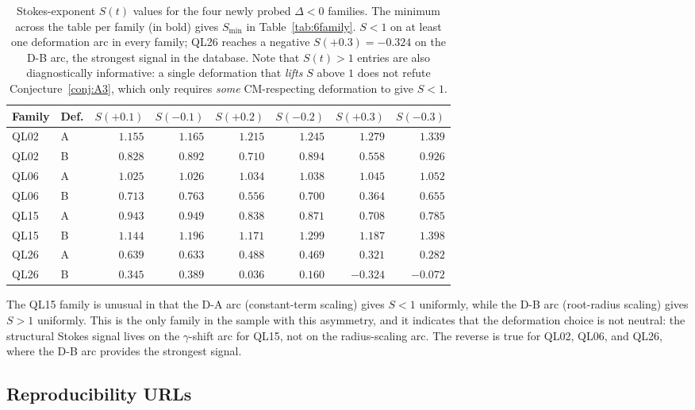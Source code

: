 \documentclass[11pt,reqno]{amsart}
\theoremstyle{definition}
\begin{document}
\begin{table}[h]
\centering
\small
\begin{tabular}{llrrrrrr}
\toprule
Family & Def. & $S(+0.1)$ & $S(-0.1)$ & $S(+0.2)$ & $S(-0.2)$ & $S(+0.3)$ & $S(-0.3)$ \\
\midrule
QL02 & A & $1.155$  & $1.165$  & $1.215$  & $1.245$  & $1.279$  & $1.339$ \\
QL02 & B & $0.828$  & $0.892$  & $0.710$  & $0.894$  & $\mathbf{0.558}$ & $0.926$ \\
QL06 & A & $1.025$  & $1.026$  & $1.034$  & $1.038$  & $1.045$  & $1.052$ \\
QL06 & B & $0.713$  & $0.763$  & $0.556$  & $0.700$  & $\mathbf{0.364}$ & $0.655$ \\
QL15 & A & $0.943$  & $0.949$  & $0.838$  & $0.871$  & $0.708$  & $0.785$ \\
QL15 & B & $1.144$  & $1.196$  & $1.171$  & $1.299$  & $1.187$  & $1.398$ \\
QL26 & A & $0.639$  & $0.633$  & $0.488$  & $0.469$  & $0.321$  & $0.282$ \\
QL26 & B & $0.345$  & $0.389$  & $0.036$  & $0.160$  & $\mathbf{-0.324}$ & $-0.072$ \\
\bottomrule
\end{tabular}
\caption{Stokes-exponent $S(t)$ values
for the four newly probed $\Delta<0$ families. The minimum
across the table per family (in bold) gives $S_{\min}$ in
Table~\ref{tab:6family}. $S<1$ on at least one deformation
arc in every family; QL26 reaches a negative
$S(+0.3)=-0.324$ on the D-B arc, the strongest signal in
the database. Note that $S(t)>1$ entries are also
diagnostically informative: a single deformation that
\emph{lifts} $S$ above $1$ does not refute
Conjecture~\ref{conj:A3}, which only requires \emph{some}
CM-respecting deformation to give $S<1$.}
\label{tab:full-S}
\end{table}

The QL15 family is unusual in that the D-A arc
(constant-term scaling) gives $S<1$ uniformly, while the
D-B arc (root-radius scaling) gives $S>1$ uniformly.
This is the only family in the sample with this asymmetry,
and it indicates that the deformation choice is not
neutral: the structural Stokes signal lives on the
$\gamma$-shift arc for QL15, not on the radius-scaling arc.
The reverse is true for QL02, QL06, and QL26, where the
D-B arc provides the strongest signal.

\subsection{Reproducibility URLs}\label{app:repro}
\end{document}
